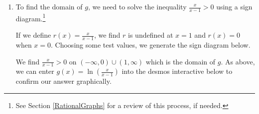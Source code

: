 \documentclass{ximera}
\begin{document}
\begin{example}
\begin{explanation}
\begin{enumerate}
 

Next, we multiply the $y$-coordinates by $2$ which results in a vertical stretch by a factor of $2$, then we finish by subtracting $1$ from the $y$-coordinates which shifts the graph down $1$ unit.  


 

Tracking points, we find:   $(0.1, -1) \rightarrow  (-2.9, -1) \rightarrow (2.9, -1) \rightarrow (2.9, -2) \rightarrow (2.9, -3)$, $(1,0) \rightarrow (-2,0) \rightarrow (2,0) \rightarrow (2,0) \rightarrow (2,-1)$, and  $(10,1) \rightarrow (7,1) \rightarrow (-7,1) \rightarrow (-7,2) \rightarrow (-7,1)$.  The vertical shift and reflection about the $y$-axis affects the vertical asymptote:  $x = 0 \rightarrow x = -3 \rightarrow x = 3$.  


 

Plotting these three points along with the vertical asymptote produces the graph of $f$ as seen above.


\item  To find the domain of $g$, we need to solve the inequality $\frac{x}{x-1} > 0$ using a sign diagram.\footnote{See Section \ref{RationalGraphs} for a review of this process, if needed.}  

 

If we define $r(x) = \frac{x}{x-1}$, we find $r$ is undefined at $x=1$ and $r(x) = 0$ when $x=0$.  Choosing some test values, we generate the sign diagram below.  

\begin{image}
% 

\end{image} 
 

We find $ \frac{x}{x-1} > 0$ on $(-\infty, 0) \cup (1, \infty)$ which is the domain of  $g$. As above, we can enter $g(x) = \ln \left(\frac{x}{x-1}\right)$ into the desmos interactive below to confirm our answer graphically.


\begin{center}
\end{center}


\end{enumerate}
\end{explanation}
\end{example}
\end{document}
